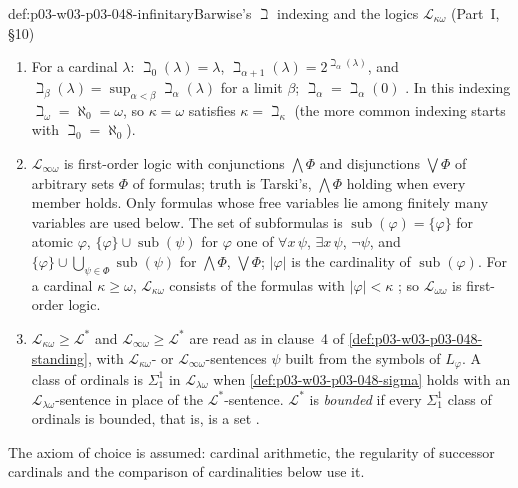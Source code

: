 \begin{hbdefinition}{def:p03-w03-p03-048-infinitary}{Barwise's \(\beth\) indexing and the logics \(\mathcal L_{\kappa\omega}\) (Part~I, \S10)}
\begin{enumerate}
\item For a cardinal \(\lambda\): \(\beth_0(\lambda)=\lambda\),
      \(\beth_{\alpha+1}(\lambda)=2^{\beth_\alpha(\lambda)}\), and
      \(\beth_\beta(\lambda)=\sup_{\alpha<\beta}\beth_\alpha(\lambda)\) for a
      limit \(\beta\); \(\beth_\alpha=\beth_\alpha(0)\)
      \cite[Part~I, \S10, p.~246]{Barwise1974Axioms}.  In this indexing
      \(\beth_\omega=\aleph_0=\omega\), so \(\kappa=\omega\) satisfies
      \(\kappa=\beth_\kappa\) (the more common indexing starts with
      \(\beth_0=\aleph_0\)).
\item \(\mathcal L_{\infty\omega}\) is first-order logic with conjunctions
      \(\bigwedge\Phi\) and disjunctions \(\bigvee\Phi\) of arbitrary sets
      \(\Phi\) of formulas; truth is Tarski's, \(\bigwedge\Phi\) holding when
      every member holds.  Only formulas whose free variables lie among
      finitely many variables are used below.  The set of subformulas is
      \(\operatorname{sub}(\varphi)=\{\varphi\}\) for atomic \(\varphi\),
      \(\{\varphi\}\cup\operatorname{sub}(\psi)\) for \(\varphi\) one of
      \(\forall x\,\psi\), \(\exists x\,\psi\), \(\neg\psi\), and
      \(\{\varphi\}\cup\bigcup_{\psi\in\Phi}\operatorname{sub}(\psi)\) for
      \(\bigwedge\Phi\), \(\bigvee\Phi\); \(|\varphi|\) is the cardinality of
      \(\operatorname{sub}(\varphi)\).  For a cardinal \(\kappa\geq\omega\),
      \(\mathcal L_{\kappa\omega}\) consists of the formulas with
      \(|\varphi|<\kappa\) \cite[p.~246]{Barwise1974Axioms}; so
      \(\mathcal L_{\omega\omega}\) is first-order logic.
\item \(\mathcal L_{\kappa\omega}\geq\mathcal L^{\ast}\) and
      \(\mathcal L_{\infty\omega}\geq\mathcal L^{\ast}\) are read as in
      clause~4 of \cref{def:p03-w03-p03-048-standing}, with
      \(\mathcal L_{\kappa\omega}\)- or \(\mathcal L_{\infty\omega}\)-sentences
      \(\psi\) built from the symbols of \(L_\varphi\).  A class of ordinals
      is \(\Sigma^1_1\) in \(\mathcal L_{\lambda\omega}\) when
      \cref{def:p03-w03-p03-048-sigma} holds with an
      \(\mathcal L_{\lambda\omega}\)-sentence in place of the
      \(\mathcal L^{\ast}\)-sentence.  \(\mathcal L^{\ast}\) is
      \emph{bounded} if every \(\Sigma^1_1\) class of ordinals is bounded,
      that is, is a set \cite[Part~II, \S1, p.~252]{Barwise1974Axioms}.
\end{enumerate}
The axiom of choice is assumed: cardinal arithmetic, the regularity of
successor cardinals and the comparison of cardinalities below use it.
\end{hbdefinition}

